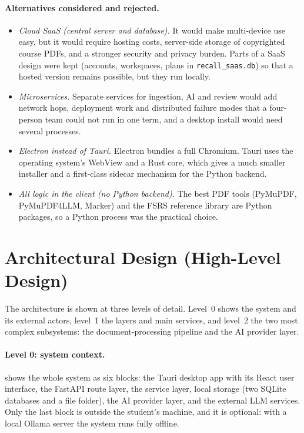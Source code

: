 \paragraph{Alternatives considered and rejected.}
\begin{itemize}[leftmargin=*]
  \item \emph{Cloud SaaS (central server and database).} It would make multi-device use
    easy, but it would require hosting costs, server-side storage of copyrighted course
    PDFs, and a stronger security and privacy burden. Parts of a SaaS design were kept
    (accounts, workspaces, plans in \texttt{recall\_saas.db}) so that a hosted version
    remains possible, but they run locally.
  \item \emph{Microservices.} Separate services for ingestion, AI and review would add
    network hops, deployment work and distributed failure modes that a four-person
    team could not run in one term, and a desktop install would need several
    processes.
  \item \emph{Electron instead of Tauri.} Electron bundles a full Chromium. Tauri uses the
    operating system's WebView and a Rust core, which gives a much smaller installer and
    a first-class sidecar mechanism for the Python backend.
  \item \emph{All logic in the client (no Python backend).} The best PDF tools
    (PyMuPDF, PyMuPDF4LLM, Marker) and the FSRS reference library are Python packages,
    so a Python process was the practical choice.
\end{itemize}

\section{Architectural Design (High-Level Design)}\label{sec:arch_hld}

The architecture is shown at three levels of detail. Level~0 shows the system and its
external actors, level~1 the layers and main services, and level~2 the two most
complex subsystems: the document-processing pipeline and the AI provider layer.

\paragraph{Level 0: system context.}
 shows the whole system as six blocks: the Tauri desktop app with
its React user interface, the FastAPI route layer, the service layer, local storage
(two SQLite databases and a file folder), the AI provider layer, and the external LLM
services. Only the last block is outside the student's machine, and it is optional: with
a local Ollama server the system runs fully offline.

